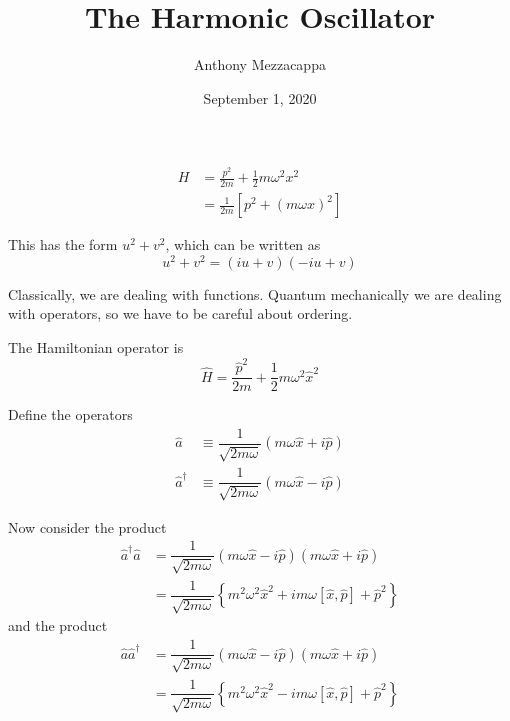 \documentclass{article}
\title{The Harmonic Oscillator}
\author{Anthony Mezzacappa}
\date{September 1, 2020}
\begin{document}
\setlength{\parskip}{1em}
\maketitle

\vspace{-24pt}
\begin{align*}
H &= \frac{p^2}{2m} + \frac{1}{2} m \omega^2 x^2 \\
  &= \frac{1}{2m} \left[ p^2 + {\left( m \omega x \right)}^2 \right]
\end{align*}

\noindent This has the form $u^2 + v^2$, which can be written as
\begin{equation*}
u^2 + v^2 = ( i u + v ) ( -i u + v )
\end{equation*}

\noindent Classically, we are dealing with functions. Quantum mechanically we are dealing with operators, so we have to be careful about ordering.

\noindent The Hamiltonian operator is
\begin{equation*}
\hat{H} = \frac{\hat{p}^2}{2m} + \frac{1}{2} m \omega^2 \hat{x}^2
\end{equation*}

\noindent Define the operators
\begin{align*}
\hat{a} &\equiv \dfrac{1}{\sqrt{2 m \omega}} ( m \omega \hat{x} + i \hat{p} ) \\
\hat{a}^\dagger &\equiv \dfrac{1}{\sqrt{2 m \omega}} ( m \omega \hat{x} - i \hat{p} )
\end{align*}


\noindent Now consider the product
\begin{align*}
\hat{a}^\dagger \hat{a} &= \dfrac{1}{\sqrt{2 m \omega}} ( m \omega \hat{x} - i \hat{p} ) ( m \omega \hat{x} + i \hat{p} ) \\
&= \dfrac{1}{\sqrt{2 m \omega}} \left\lbrace m^2 \omega^2 \hat{x}^2 + i m \omega [ \hat{x}, \hat{p} ] + \hat{p}^2 \right\rbrace
\end{align*}
and the product
\begin{align*}
\hat{a} \hat{a}^\dagger &= \dfrac{1}{\sqrt{2 m \omega}} ( m \omega \hat{x} - i \hat{p} ) ( m \omega \hat{x} + i \hat{p} ) \\
&= \dfrac{1}{\sqrt{2 m \omega}} \left\lbrace m^2 \omega^2 \hat{x}^2 - i m \omega [ \hat{x}, \hat{p} ] + \hat{p}^2 \right\rbrace
\end{align*}
\end{document}
